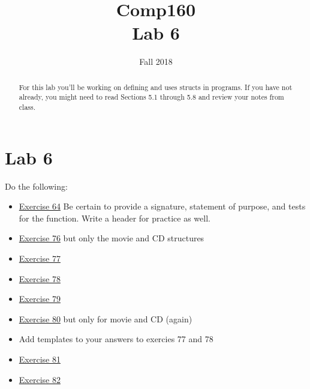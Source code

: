 \documentclass[nobib]{tufte-handout}
\title{Comp160 \\ Lab 6 }
\author{}
\date{ Fall 2018 }
\begin{document}
\maketitle

\begin{abstract}
For this lab you'll be working on defining and uses structs in programs.  If you have not already, you might need to read Sections 5.1 through 5.8 and review your notes from class. 
\end{abstract}

\section*{Lab 6}

Do the following:
\begin{itemize}
  \item \href{https://htdp.org/2018-01-06/Book/part_one.html#%28counter._%28exercise._struct2%29%29}{Exercise 64} Be certain to provide a signature, statement of purpose, and tests for the function.  Write a header for practice as well.
  \item \href{https://htdp.org/2018-01-06/Book/part_one.html#%28counter._data-uni._%28exercise._struct7%29%29}{Exercise 76} but only the movie and CD structures
  \item \href{https://htdp.org/2018-01-06/Book/part_one.html#%28counter._data-uni._%28exercise._ex~3atime-structure%29%29}{Exercise 77}
  \item \href{https://htdp.org/2018-01-06/Book/part_one.html#%28counter._data-uni._%28exercise._struct9%29%29}{Exercise 78}
  \item \href{https://htdp.org/2018-01-06/Book/part_one.html#%28counter._data-uni._%28exercise._struct10%29%29}{Exercise 79}
  \item \href{https://htdp.org/2018-01-06/Book/part_one.html#%28counter._%28exercise._struct11%29%29}{Exercise 80} but only for movie and CD (again)
  \item Add templates to your answers to exercies 77 and 78
  \item \href{https://htdp.org/2018-01-06/Book/part_one.html#%28counter._%28exercise._struct11a%29%29}{Exercise 81}
  \item \href{https://htdp.org/2018-01-06/Book/part_one.html#%28counter._%28exercise._struct11b%29%29}{Exercise 82}
\end{itemize}
\end{document}
